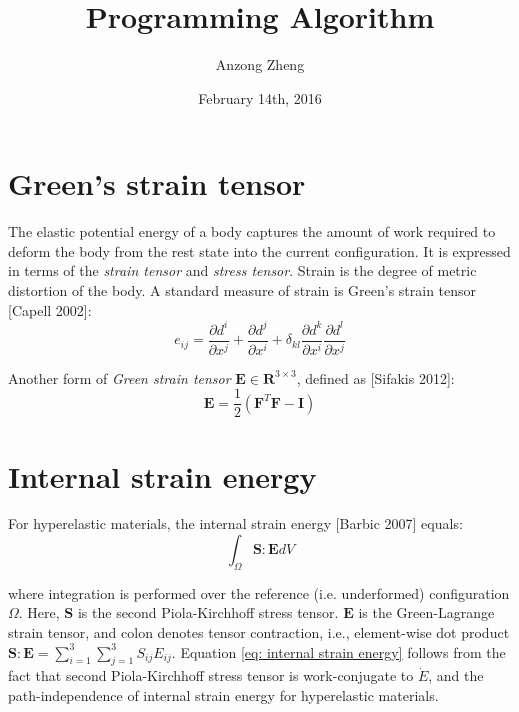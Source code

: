 \documentclass[10pt,a4paper]{article}
\begin{document}
\author{Anzong Zheng}
\title{Programming Algorithm}
\date{February 14th, 2016}
\maketitle
\newpage

\section{Green's strain tensor}
The elastic potential energy of a body captures the amount of work required to deform the body from the rest state into the current configuration. It is expressed in terms of the \textit{strain tensor} and \textit{stress tensor}. Strain is the degree of metric distortion of the body. A standard measure of strain is Green's strain tensor [Capell 2002]:
\begin{equation}
e_{ij} = \dfrac{\partial d^i}{\partial x^j} + \dfrac{\partial d^j}{\partial x^i} + \delta_{kl} \dfrac{\partial d^k}{\partial x^i} \dfrac{\partial d^l}{\partial x^j}
\end{equation}

Another form of \textit{Green strain tensor} $ \mathbf{E} \in \mathbf{R}^{3 \times 3} $, defined as [Sifakis 2012]:
\begin{equation}
\mathbf{E} = \dfrac{1}{2} \left( \mathbf{F}^T \mathbf{F} - \mathbf{I} \right) 
\end{equation}

\section{Internal strain energy}
For hyperelastic materials, the internal strain energy [Barbic 2007] equals:
\begin{equation} \label{eq: internal strain energy}
\int_{\Omega} \mathbf{S} : \mathbf{E} dV
\end{equation}

where integration is performed over the reference (i.e. underformed) configuration $ \Omega $. Here, $ \mathbf{S} $ is the second Piola-Kirchhoff stress tensor. $ \mathbf{E} $ is the Green-Lagrange strain tensor, and colon denotes tensor contraction, i.e., element-wise dot product $ \mathbf{S} : \mathbf{E} = \sum_{i=1}^{3} \sum_{j=1}^{3} S_{ij} E_{ij} $. Equation \ref{eq: internal strain energy} follows from the fact that second Piola-Kirchhoff stress tensor is work-conjugate to $ \dot{E} $, and the path-independence of internal strain energy for hyperelastic materials.
\end{document}
